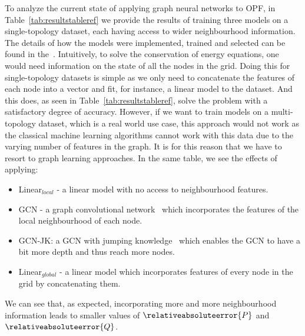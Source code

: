 To analyze the current state of applying graph neural networks to
OPF, in Table~\ref{tab:resultstableref} we provide the results of training three models on a single-topology dataset, each having access to
wider neighbourhood information.
The details of how the models were implemented, trained and selected can be found in the~.
Intuitively, to solve the conservation of energy equations, one would need information on the
state of all the nodes in the grid.
Doing this for single-topology datasets is simple as we only need to concatenate the
features of each node into a vector and fit, for instance, a linear model to the dataset.
And this does, as seen in Table~\ref{tab:resultstableref},
solve the problem with a satisfactory degree of accuracy.
However, if we want to train models on a multi-topology dataset, which is a real world use case,
this approach would not work as the classical machine learning algorithms cannot work with
this data due to the varying number of features in the graph.
It is for this reason that we have to resort to graph learning approaches.
In the same table, we see the effects of applying:

\begin{itemize}
    \item Linear$_{local}$ - a linear model with no access to neighbourhood features.
    \item GCN - a graph convolutional network~\cite{kipf2016semi} which incorporates the features of the
    local neighbourhood of each node.
    \item GCN-JK: a GCN with jumping knowledge~\cite{xu2018representation} which enables the GCN to have a bit
    more depth and thus reach more nodes.
    \item Linear$_{global}$ - a linear model which incorporates features of every node in the grid
    by concatenating them.
\end{itemize}

\noindent We can see that, as expected, incorporating more and more neighbourhood information leads to
smaller values of $\relativeabsoluteerror{P}$ and $\relativeabsoluteerror{Q}$.

